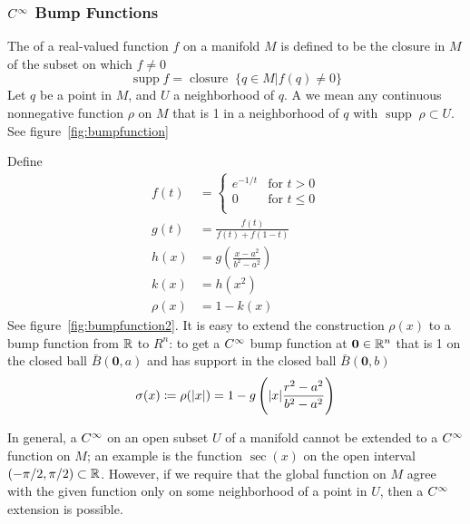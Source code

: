 \subsubsection{\(C^\infty\) Bump Functions}
\newcommand{\supp}{\operatorname{supp}}

The  of a real-valued function \(f\) on a manifold \(M\) is defined to be the closure in \(M\) of the subset on which \(f \neq 0\)
\begin{equation}
    \operatorname{supp} f = \operatorname{closure}\; \{ q \in M | f(q) \neq 0 \}
\end{equation}
Let \(q\) be a point in \(M\), and \(U\) a neighborhood of \(q\).
A  we mean any continuous nonnegative function \(\rho\) on \(M\) that is 1 in a neighborhood of \(q\) with \(\supp\; \rho \subset U\).
See figure~\ref{fig:bumpfunction}

Define 
\begin{align}
    f(t) &= \begin{cases}
        e^{-1/t} &\text{for } t > 0 \\  
        0 &\text{for } t \leq 0 \\  
    \end{cases} \\
    g(t) &= \frac{f(t)}{f(t) + f(1-t)} \\ 
    h(x) &= g \left( \frac{x-a^2}{b^2 -a^2} \right) \\ 
    k(x) &= h(x^2) \\ 
    \rho(x) &= 1 - k(x)
\end{align}
See figure~\ref{fig:bumpfunction2}.
It is easy to extend the construction \(\rho(x)\) to a bump function from \(\mathbb{R}\) to \(R^n\): to get a \(C^\infty\) bump function at \(\bm{0} \in \mathbb{R}^n\) that is 1 on the closed ball \(\bar{B}(\bm{0}, a)\) and has support in the closed ball \(\bar{B}(\bm{0}, b)\)
\begin{equation}
    \sigma(x) \coloneqq \rho(\abs{x}) = 1 - g \left( \abs{x} \frac{r^2 - a^2}{b^2 -a^2} \right)
\end{equation}

In general, a \(C^\infty\) on an open subset \(U\) of a manifold cannot be extended to a \(C^\infty\) function on \(M\); an example is the function \(\sec (x)\) on the open interval \((-\pi/2, \pi/2) \subset \mathbb{R}\).
However, if we require that the global function on \(M\) agree with the given function only on some neighborhood of a point in \(U\), then a \(C^\infty\) extension is possible.


